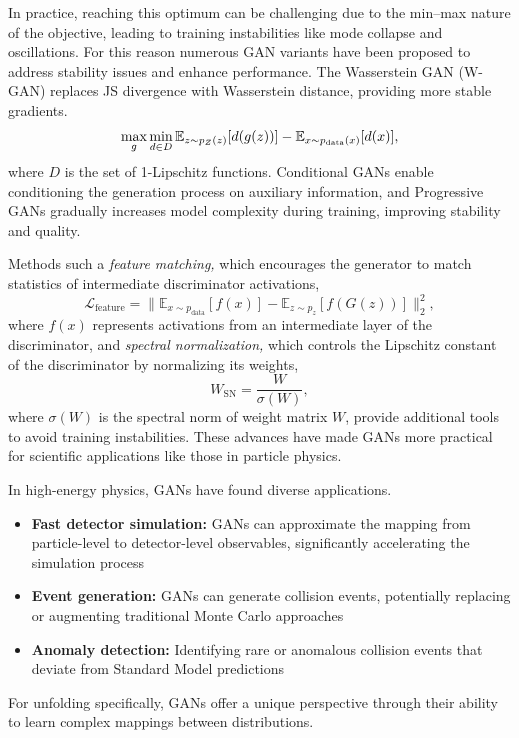        In practice, reaching this optimum can be challenging due to the min--max nature of the objective, leading to training instabilities like mode collapse and oscillations.
        For this reason numerous GAN variants have been proposed to address stability issues and enhance performance.
        The Wasserstein GAN (W-GAN)  replaces JS divergence with Wasserstein distance, providing more stable gradients.
        \begin{equation}
        \max_g\min_{d\in D}\mathbb{E}_{z\sim p_Z(z)} \qty[d(g(z))] - \mathbb{E}_{x\sim p_{\text{data}}(x)} \qty[d(x)],
        \end{equation}
        where $D$ is the set of 1-Lipschitz functions.
        Conditional GANs  enable conditioning the generation process on auxiliary information, and
        Progressive GANs  gradually increases model complexity during training, improving stability and quality.
    
        Methods such a \emph{feature matching,} which encourages the generator to match statistics of intermediate discriminator activations,
        \begin{equation}
            \mathcal{L}_{\text{feature}} = \|\mathbb{E}_{x \sim p_{\text{data}}}[f(x)] - \mathbb{E}_{z \sim p_z}[f(G(z))]\|_2^2,
        \end{equation}
        where \(f(x)\) represents activations from an intermediate layer of the discriminator, and
        \emph{spectral normalization,} which controls the Lipschitz constant of the discriminator by normalizing its weights,
        \begin{equation}
            W_{\text{SN}} = \frac{W}{\sigma(W)},
        \end{equation}
        where \(\sigma(W)\) is the spectral norm of weight matrix \(W\), provide additional tools to avoid training instabilities.
        These advances have made GANs more practical for scientific applications like those in particle physics.
    
        In high-energy physics, GANs have found diverse applications.
        \begin{itemize}
            \item \textbf{Fast detector simulation:} GANs can approximate the mapping from particle-level to detector-level observables, significantly accelerating the simulation process 
            \item \textbf{Event generation:} GANs can generate collision events, potentially replacing or augmenting traditional Monte Carlo approaches 
            \item \textbf{Anomaly detection:} Identifying rare or anomalous collision events that deviate from Standard Model predictions 
        \end{itemize}
        For unfolding specifically, GANs offer a unique perspective through their ability to learn complex mappings between distributions.
    
